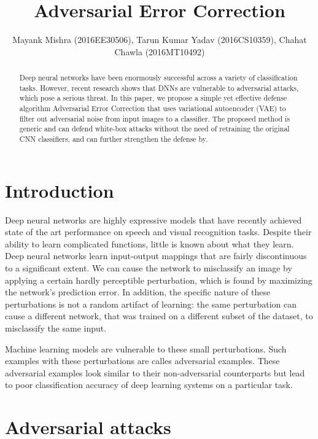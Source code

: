 \documentclass[journal]{IEEEtran}
\begin{document}
\title{Adversarial Error Correction}

\author{Mayank Mishra (2016EE30506), Tarun Kumar Yadav (2016CS10359), Chahat Chawla (2016MT10492)}

\maketitle

\begin{abstract}
Deep neural networks have been enormously successful across a variety of classification tasks. However, recent research shows that DNNs are vulnerable to adversarial attacks, which pose a serious threat. In this paper, we propose a simple yet effective defense algorithm Adversarial Error Correction that uses variational autoencoder (VAE) to filter out adversarial noise from input images to a classifier. The proposed method is generic and can defend white-box attacks without the need of retraining the original CNN classifiers, and can further strengthen the defense by.
\end{abstract}

\section{Introduction}
Deep neural networks are highly expressive models that have recently achieved
state of the art performance on speech and visual recognition tasks. Despite their ability to learn complicated functions, little is known about what they learn. Deep neural networks learn input-output mappings that are fairly discontinuous to a significant extent. We can cause the network to misclassify an image by applying a certain hardly perceptible perturbation, which is found by maximizing the network’s prediction error. In addition, the specific nature of these perturbations is not a random artifact of learning: the same perturbation can cause a different network, that was trained on a different subset of the dataset, to misclassify the same input.

Machine learning models are vulnerable to these small perturbations. Such examples with these perturbations are calles adversarial examples. These adversarial examples look similar to their non-adversarial counterparts but lead to poor classification accuracy of deep learning systems on a particular task.

\section{Adversarial attacks}
\end{document}
